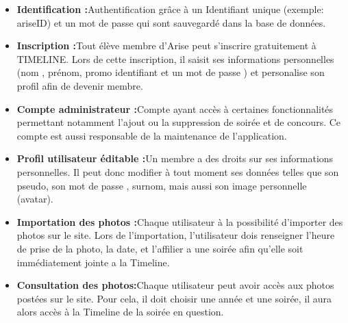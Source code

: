 \documentclass[11pt]{article} %
\begin{document}
\begin {itemize}
\item \textbf{Identification :}Authentification grâce à un Identifiant unique (exemple: ariseID) et un mot de passe qui sont sauvegardé dans la base de données.

\item \textbf{Inscription :}Tout élève membre d'Arise peut s’inscrire gratuitement à TIMELINE.
Lors de cette inscription, il saisit ses informations personnelles (nom , prénom, promo  identifiant et un mot de passe ) et personalise son profil afin de devenir membre.

\item \textbf{Compte administrateur :}Compte ayant accès à certaines fonctionnalités permettant notamment l’ajout ou la suppression de soirée et de concours. Ce compte est aussi responsable de la maintenance de l’application.

\item \textbf{Profil utilisateur éditable :}Un membre a des droits sur ses informations personnelles. Il peut donc modifier à tout moment ses données telles que son pseudo, son mot de passe , surnom, mais aussi son image personnelle (avatar). 

\item \textbf{Importation des photos :}Chaque utilisateur à la possibilité d’importer des photos sur le site. Lors de l’importation, l’utilisateur dois renseigner l’heure de prise de la photo, la date, et l’affilier a une soirée afin qu’elle soit immédiatement jointe a la Timeline.

\item \textbf{Consultation des photos:}Chaque utilisateur peut avoir accès aux photos postées sur le site. Pour cela, il doit choisir une année et une soirée, il aura alors accès à la Timeline de la soirée en question.

\end{itemize}

\newpage
\end{document}
